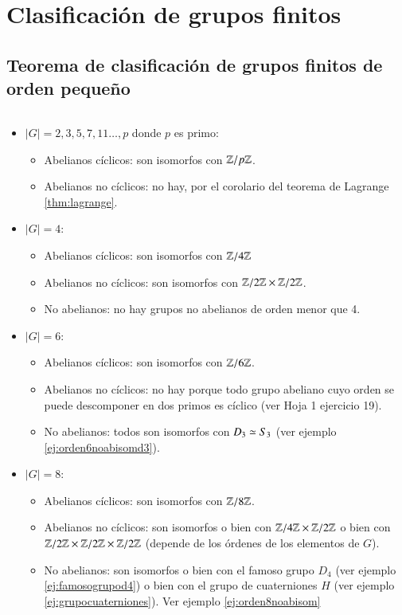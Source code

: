\section{Clasificación de grupos finitos}

\subsection{Teorema de clasificación de grupos finitos de orden pequeño}

\label{gruposfinitosnotables}

\begin{thm}$ $\newline
	\label{thm:clasificacionfinitos}
	
	\begin{itemize}
		\item $|G| = 2, 3, 5, 7, 11 \dots, p$ donde $p$ es primo:
		\begin{itemize}
			\item Abelianos cíclicos: son isomorfos con $\mathbb{Z}/p\mathbb{Z}$.
			\item Abelianos no cíclicos: no hay, por el corolario del teorema de Lagrange \ref{thm:lagrange}.
		\end{itemize}
		\item $|G| = 4$:
		\begin{itemize}
			\item Abelianos cíclicos: son isomorfos con $\mathbb{Z}/4\mathbb{Z}$
			\item Abelianos no cíclicos: son isomorfos con $\mathbb{Z}/2\mathbb{Z} \times \mathbb{Z}/2\mathbb{Z}$.
			\item No abelianos: no hay grupos no abelianos de orden menor que 4.
		\end{itemize}
		\item $|G| = 6$:
		\begin{itemize}
			\item Abelianos cíclicos: son isomorfos con $\mathbb{Z}/6\mathbb{Z}$.
			\item Abelianos no cíclicos: no hay porque todo grupo abeliano cuyo orden se puede descomponer en dos primos es cíclico (ver Hoja 1 ejercicio 19).
			\item No abelianos: todos son isomorfos con $D_3 \simeq S_3$ (ver ejemplo \ref{ej:orden6noabisomd3}).
		\end{itemize}
		\item $|G| = 8$:
		\begin{itemize}
			\item Abelianos cíclicos: son isomorfos con $\mathbb{Z}/8\mathbb{Z}$.
			\item Abelianos no cíclicos: son isomorfos o bien con $\mathbb{Z}/4\mathbb{Z} \times \mathbb{Z}/2\mathbb{Z}$ o bien con $\mathbb{Z}/2\mathbb{Z} \times \mathbb{Z}/2\mathbb{Z} \times \mathbb{Z}/2\mathbb{Z}$ (depende de los órdenes de los elementos de $G$).
			\item No abelianos: son isomorfos o bien con el famoso grupo $D_4$ (ver ejemplo \ref{ej:famosogrupod4}) o bien con el grupo de cuaterniones $H$ (ver ejemplo \ref{ej:grupocuaterniones}). Ver ejemplo \ref{ej:orden8noabisom}
		\end{itemize}
	\end{itemize}
	
\end{thm}

